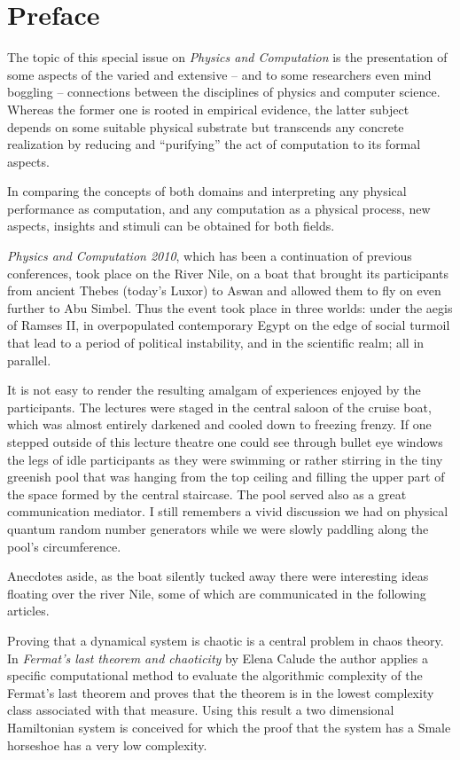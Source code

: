\documentclass{article}
\begin{document}
\section*{Preface}


The topic of this special issue on {\em Physics and Computation}
is the presentation of some aspects of the varied and extensive
-- and to some researchers even mind boggling --
connections between the disciplines of physics and computer science.
Whereas the former  one is rooted in empirical evidence, the latter subject
depends on some suitable physical substrate but transcends any
concrete realization
by reducing and ``purifying'' the act of computation to its formal aspects.


In comparing the concepts of both domains and interpreting any
physical performance as computation,
and any computation as a physical process, new aspects, insights and
stimuli can be obtained for both fields.



{\em Physics and Computation 2010}, which has been a continuation of
previous conferences,
took place on the River Nile,
on a boat that brought its participants from ancient Thebes (today's Luxor) to
Aswan and allowed them to fly on even further to Abu Simbel.
Thus the event took place in three worlds:
under the aegis of Ramses II,
in overpopulated contemporary Egypt on the edge of social turmoil that
lead to a period of political instability,
and in the scientific realm; all in parallel.



It is not easy to render the resulting amalgam of experiences enjoyed
by the participants.
The lectures were staged in the central saloon of the cruise boat,
which was almost entirely darkened and cooled down to freezing frenzy.
If one stepped outside of this lecture theatre one could see through
bullet eye windows the legs of idle participants as they were swimming
or rather stirring in the
tiny greenish pool that was hanging from the top ceiling and filling
the upper part of the space formed by the central staircase.
The pool served also as a great communication mediator.
I still remembers a vivid discussion we had on physical
quantum random
number generators
while we were slowly paddling along the pool's circumference.


Anecdotes aside, as the boat silently tucked away there were interesting ideas floating over the river Nile,
some of which are communicated in the following articles.


Proving that a dynamical system is chaotic is a central problem in
chaos theory.
In {\em Fermat's last theorem and chaoticity} by Elena Calude
the author applies a specific computational method  to
evaluate the algorithmic complexity of the Fermat's last theorem and
proves that the theorem is in the lowest complexity class associated
with that measure.
Using this result a two dimensional Hamiltonian system   is conceived
for which the proof that the system has a Smale horseshoe has a very
low complexity.
\end{document}
